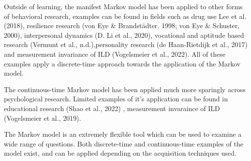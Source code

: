 \documentclass[12pt]{./styles/outhesis}
\begin{document}
Outside of learning, the manifest Markov model has been applied to other
forms of behavioral research, examples can be found in fields such as
drug use Lee et al. (2018), resilience research (von Eye \&
Brandstädter, 1998; von Eye \& Schuster, 2000), interpersonal dynamics
(D. Li et al., 2020), vocational and aptitude based research (Vermunt et
al., n.d.),personality research (de Haan-Rietdijk et al., 2017) and
measurement invariance of ILD (Vogelsmeier et al., 2022). All of these
examples apply a discrete-time approach towards the application of the
Markov model.

The continuous-time Markov model has been applied much more sparingly
across psychological research. Limited examples of it's application can be found
in educational research (Shao et al., 2022) , measurement invaraince of ILD (Vogelsmeier et
al., 2019). 

The Markov model is an extremely flexible tool which can be used to
examine a wide range of questions. Both discrete-time and
continuous-time examples of the model exist, and can be applied
depending on the acquisition techniques used.
\end{document}
